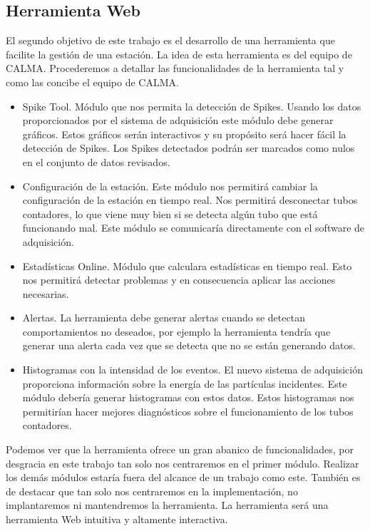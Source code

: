 	\subsection{Herramienta Web}
		El segundo objetivo de este trabajo es el desarrollo de una herramienta que facilite la gestión de una estación. La idea de esta
		herramienta es del equipo de CALMA. Procederemos a detallar las funcionalidades de la herramienta tal y como las concibe el equipo de
		CALMA.
		\begin{itemize}
	         	\item	Spike Tool. Módulo que nos permita la detección de Spikes. Usando los datos proporcionados por el sistema de
			  	adquisición este módulo debe generar gráficos. Estos gráficos serán interactivos y su propósito será hacer fácil la
				detección de Spikes. Los Spikes detectados podrán ser marcados como nulos en el conjunto de datos revisados. 
			\item 	Configuración de la estación. Este módulo nos permitirá cambiar la configuración de la estación en tiempo real. Nos
			  	permitirá desconectar tubos contadores, lo que viene muy bien si se detecta algún tubo que está funcionando mal. Este
				módulo se comunicaría directamente con el software de adquisición. 
			\item 	Estadísticas Online. Módulo que calculara estadísticas en tiempo real. Esto nos permitirá detectar problemas y en
			  	consecuencia aplicar las acciones necesarias. 
			\item	Alertas. La herramienta debe generar alertas cuando se detectan comportamientos no deseados, por ejemplo la
			  	herramienta tendría que generar una alerta cada vez que se detecta que no se están generando datos.
			\item 	Histogramas con la intensidad de los eventos. El nuevo sistema de adquisición proporciona información sobre la energía
			  	de las partículas incidentes. Este módulo debería generar histogramas con estos datos. Estos histogramas nos
				permitirían hacer mejores diagnósticos sobre el funcionamiento de los tubos contadores. 
		\end{itemize}
		Podemos ver que la herramienta ofrece un gran abanico de funcionalidades, por desgracia en este trabajo tan solo nos centraremos en el
		primer módulo. Realizar los demás módulos estaría fuera del alcance de un trabajo como este. También es de destacar que tan solo nos
		centraremos en la implementación, no implantaremos ni mantendremos la herramienta. La herramienta será una herramienta Web intuitiva y
		altamente interactiva. 

